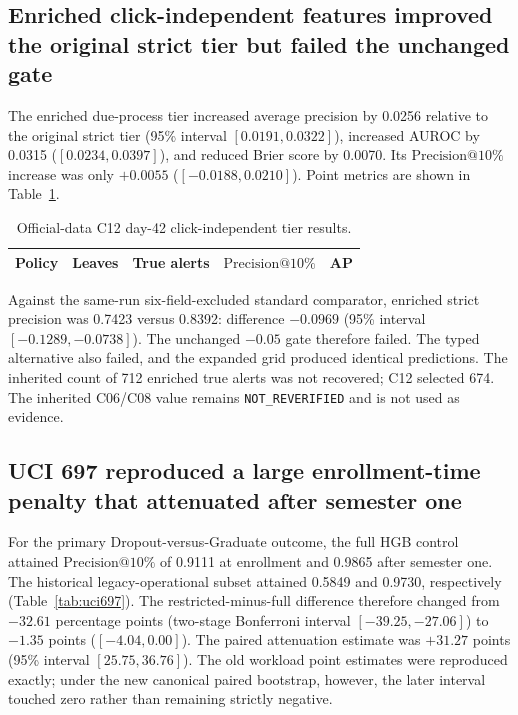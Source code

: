 \documentclass[11pt]{article}
\makeatletter
\newcommand{\Pten}{\ensuremath{\mathrm{Precision}@10\%}}
\makeatother
\begin{document}
\subsection{Enriched click-independent features improved the original strict tier but failed the unchanged gate}

The enriched due-process tier increased average precision by 0.0256 relative to the original strict tier (95\% interval $[0.0191,0.0322]$), increased AUROC by 0.0315 ($[0.0234,0.0397]$), and reduced Brier score by 0.0070. Its \Pten{} increase was only $+0.0055$ ($[-0.0188,0.0210]$). Point metrics are shown in Table~\ref{tab:strict}.

\begin{table}[htbp]
\centering
\caption{Official-data C12 day-42 click-independent tier results.}
\label{tab:strict}
\small
\begin{tabular}{lrrrr}
\toprule
Policy & Leaves & True alerts & \Pten & AP \\
\midrule

\end{tabular}
\end{table}

Against the same-run six-field-excluded standard comparator, enriched strict precision was 0.7423 versus 0.8392: difference $-0.0969$ (95\% interval $[-0.1289,-0.0738]$). The unchanged $-0.05$ gate therefore failed. The typed alternative also failed, and the expanded grid produced identical predictions. The inherited count of 712 enriched true alerts was not recovered; C12 selected 674. The inherited C06/C08 value remains \texttt{NOT\_REVERIFIED} and is not used as evidence.

\subsection{UCI 697 reproduced a large enrollment-time penalty that attenuated after semester one}

For the primary Dropout-versus-Graduate outcome, the full HGB control attained \Pten{} of 0.9111 at enrollment and 0.9865 after semester one. The historical legacy-operational subset attained 0.5849 and 0.9730, respectively (Table~\ref{tab:uci697}). The restricted-minus-full difference therefore changed from $-32.61$ percentage points (two-stage Bonferroni interval $[-39.25,-27.06]$) to $-1.35$ points ($[-4.04,0.00]$). The paired attenuation estimate was $+31.27$ points (95\% interval $[25.75,36.76]$). The old workload point estimates were reproduced exactly; under the new canonical paired bootstrap, however, the later interval touched zero rather than remaining strictly negative.
\end{document}
